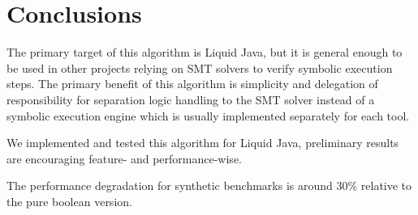 \documentclass[sigplan,screen,review]{acmart}
\begin{document}
\section{Conclusions}

The primary target of this algorithm is Liquid Java, but it is general enough to be used in other projects relying on SMT solvers to verify symbolic execution steps. The primary benefit of this algorithm is simplicity and delegation of responsibility for separation logic handling to the SMT solver instead of a symbolic execution engine which is usually implemented separately for each tool. 

We implemented and tested this algorithm for Liquid Java, preliminary results are encouraging feature- and performance-wise. 

The performance degradation for synthetic benchmarks is around 30\% relative to the pure boolean version.



\end{document}
